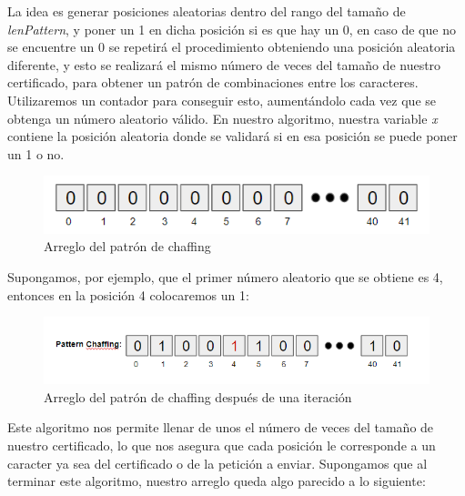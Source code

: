 \documentclass[12pt, a4paper, titlepage]{report}
\begin{document}
		    La idea es generar posiciones aleatorias dentro del rango del tamaño de \textit{lenPattern}, y poner un 1 en dicha posición si es que hay un 0, en caso de que no se encuentre un 0 se repetirá el procedimiento obteniendo una posición aleatoria diferente, y esto se realizará el mismo número de veces del tamaño de nuestro certificado, para obtener un patrón de combinaciones entre los caracteres. Utilizaremos un contador para conseguir esto, aumentándolo cada vez que se obtenga un número aleatorio válido. En nuestro algoritmo, nuestra variable \textit{x} contiene la posición aleatoria donde se validará si en esa posición se puede poner un 1 o no.\\
		    
		    \begin{figure}[H]
    			\begin{center}	                  \includegraphics[width=14cm]{./imagenes/Desarrollo/Prototipo_2/algorithm1_1.png}
				\caption{Arreglo del patrón de chaffing}
    			\end{center}
    		\end{figure}
        	
		    Supongamos, por ejemplo, que el primer número aleatorio que se obtiene es 4, entonces en la posición 4 colocaremos un 1: 
		    
		    \begin{figure}[H]
    			\begin{center}	                  \includegraphics[width=14cm]{./imagenes/Desarrollo/Prototipo_2/algorithm1_2.png}
				\caption{Arreglo del patrón de chaffing después de una iteración}
    			\end{center}
    		\end{figure}
    		
    		Este algoritmo nos permite llenar de unos el número de veces del tamaño de nuestro certificado, lo que nos asegura que cada posición le corresponde a un caracter ya sea del certificado o de la petición a enviar. Supongamos que al terminar este algoritmo, nuestro arreglo queda algo parecido a lo siguiente:
    		
\end{document}
